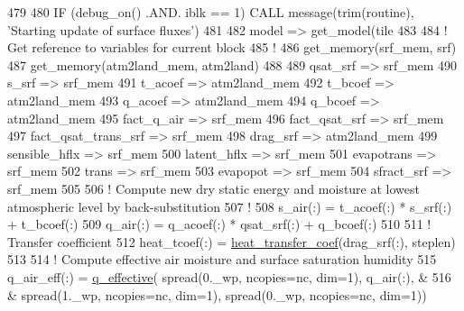 \begin{DoxyCode}
479 
480     \textcolor{keywordflow}{IF} (debug\_on() .AND. iblk == 1) \textcolor{keyword}{CALL }message(trim(routine), \textcolor{stringliteral}{'Starting update of surface fluxes'})
481 
482     model => get\_model(tile%
483 
484     \textcolor{comment}{! Get reference to variables for current block}
485     \textcolor{comment}{!}
486     get\_memory(srf\_mem, srf)
487     get\_memory(atm2land\_mem, atm2land)
488 
489     qsat\_srf             => srf\_mem  %
490     s\_srf                => srf\_mem  %
491     t\_acoef              => atm2land\_mem     %
492     t\_bcoef              => atm2land\_mem     %
493     q\_acoef              => atm2land\_mem     %
494     q\_bcoef              => atm2land\_mem     %
495     fact\_q\_air           => srf\_mem  %
496     fact\_qsat\_srf        => srf\_mem  %
497     fact\_qsat\_trans\_srf  => srf\_mem  %
498     drag\_srf             => atm2land\_mem     %
499     sensible\_hflx        => srf\_mem  %
500     latent\_hflx          => srf\_mem  %
501     evapotrans           => srf\_mem  %
502     trans                => srf\_mem  %
503     evapopot             => srf\_mem  %
504     sfract\_srf           => srf\_mem  %
505 
506     \textcolor{comment}{! Compute new dry static energy and moisture at lowest atmospheric level by back-substitution}
507     \textcolor{comment}{!}
508     s\_air(:) = t\_acoef(:) * s\_srf(:) + t\_bcoef(:)
509     q\_air(:) = q\_acoef(:) * qsat\_srf(:) + q\_bcoef(:)
510 
511     \textcolor{comment}{! Transfer coefficient}
512     heat\_tcoef(:) = \hyperlink{namespacemo__phy__schemes_a9d1fe0b8e7cc0e86d2cf43ea5ebaac58}{heat\_transfer\_coef}(drag\_srf(:), steplen)
513 
514     \textcolor{comment}{! Compute effective air moisture and surface saturation humidity}
515     q\_air\_eff(:) = \hyperlink{namespacemo__phy__schemes_a52234cb76d1efb2d2298d8fc66b61545}{q\_effective}( spread(0.\_wp, ncopies=nc, dim=1), q\_air(:), &
516                               & spread(1.\_wp, ncopies=nc, dim=1), spread(0.\_wp, ncopies=nc, dim=1))

\end{DoxyCode}
